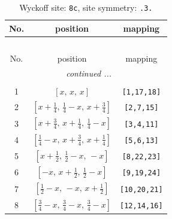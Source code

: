\documentclass[fleqn,8pt]{jsarticle}
\begin{document}
\renewcommand{\arraystretch}{1.2}
\begin{longtable}{ccc}
\caption{Wyckoff site: {\tt 8c}, site symmetry: {\tt .3.}}
 \\
 \hline \hline
No. & position & mapping \\ \hline \endfirsthead

\multicolumn{2}{l}{\tablename\ \thetable{}} \\
 \hline \hline
No. & position & mapping \\ \hline \endhead

 \hline \hline
\multicolumn{2}{r}{\footnotesize\it continued ...} \\ \endfoot

 \hline \hline
\multicolumn{2}{r}{} \\ \endlastfoot

1 & $\left[ x,\, x,\, x \right]$ & {\tt [1,17,18]} \\ \hline
2 & $\left[ x + \frac{1}{4},\, \frac{1}{4} - x,\, x + \frac{3}{4} \right]$ & {\tt [2,7,15]} \\ \hline
3 & $\left[ x + \frac{3}{4},\, x + \frac{1}{4},\, \frac{1}{4} - x \right]$ & {\tt [3,4,11]} \\ \hline
4 & $\left[ \frac{1}{4} - x,\, x + \frac{3}{4},\, x + \frac{1}{4} \right]$ & {\tt [5,6,13]} \\ \hline
5 & $\left[ x + \frac{1}{2},\, \frac{1}{2} - x,\, - x \right]$ & {\tt [8,22,23]} \\ \hline
6 & $\left[ - x,\, x + \frac{1}{2},\, \frac{1}{2} - x \right]$ & {\tt [9,19,24]} \\ \hline
7 & $\left[ \frac{1}{2} - x,\, - x,\, x + \frac{1}{2} \right]$ & {\tt [10,20,21]} \\ \hline
8 & $\left[ \frac{3}{4} - x,\, \frac{3}{4} - x,\, \frac{3}{4} - x \right]$ & {\tt [12,14,16]} \\
\end{longtable}
\renewcommand{\arraystretch}{1.2}
\end{document}
